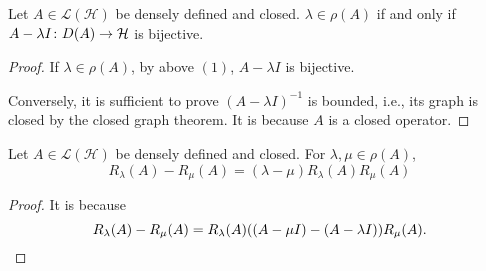 \documentclass[a4paper,12pt]{article}
\begin{document}
\begin{prop}
    Let $A \in \mathcal{L}(\mathcal{H})$ be densely defined and closed. $\lambda \in \rho(A)$ if and only if $A - \lambda I \colon D(A) \rightarrow \mathcal{H}$ is bijective.
\end{prop}
\begin{proof}
    If $\lambda \in \rho(A)$, by above $(1)$, $A - \lambda I$ is bijective.

    Conversely, it is sufficient to prove $(A - \lambda I)^{-1}$ is bounded, i.e., its graph is closed by the closed graph theorem. It is because $A$ is a closed operator.
\end{proof}

\begin{prop}
    Let $A \in \mathcal{L}(\mathcal{H})$ be densely defined and closed. For $\lambda,\mu \in \rho(A)$,
    \begin{equation*}
        R_\lambda(A) - R_\mu(A) = (\lambda - \mu)R_\lambda(A)R_\mu(A)
    \end{equation*}
\end{prop}
\begin{proof}
    It is because
    \begin{equation*}
        R_\lambda(A)-R_\mu(A)=R_\lambda(A)((A-\mu I)-(A-\lambda I)) R_\mu(A). \qedhere
    \end{equation*}
\end{proof}
\end{document}
